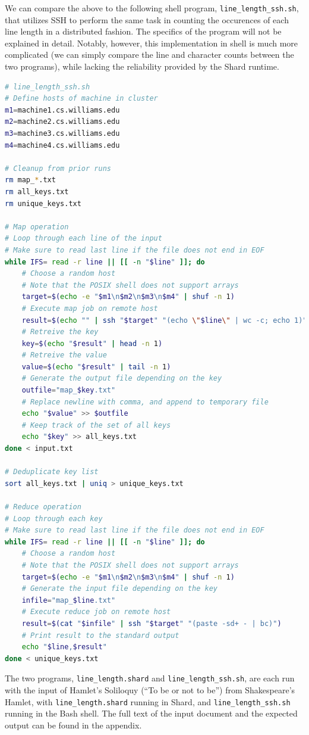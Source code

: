 \documentclass[twoside]{report}
\begin{document}
We can compare the above to the following shell program, \texttt{line\_length\_ssh.sh}, that utilizes SSH to perform the same task in counting the occurences of each line length in a distributed fashion.
The specifics of the program will not be explained in detail.
Notably, however, this implementation in shell is much more complicated (we can simply compare the line and character counts between the two programs), while lacking the reliability provided by the Shard runtime.
\begin{lstlisting}[language=sh]
# line_length_ssh.sh
# Define hosts of machine in cluster
m1=machine1.cs.williams.edu
m2=machine2.cs.williams.edu
m3=machine3.cs.williams.edu
m4=machine4.cs.williams.edu

# Cleanup from prior runs
rm map_*.txt
rm all_keys.txt
rm unique_keys.txt

# Map operation
# Loop through each line of the input
# Make sure to read last line if the file does not end in EOF
while IFS= read -r line || [[ -n "$line" ]]; do
    # Choose a random host
    # Note that the POSIX shell does not support arrays
    target=$(echo -e "$m1\n$m2\n$m3\n$m4" | shuf -n 1)
    # Execute map job on remote host
    result=$(echo "" | ssh "$target" "(echo \"$line\" | wc -c; echo 1)")
    # Retreive the key
    key=$(echo "$result" | head -n 1)
    # Retreive the value
    value=$(echo "$result" | tail -n 1)
    # Generate the output file depending on the key
    outfile="map_$key.txt"
    # Replace newline with comma, and append to temporary file
    echo "$value" >> $outfile
    # Keep track of the set of all keys
    echo "$key" >> all_keys.txt
done < input.txt

# Deduplicate key list
sort all_keys.txt | uniq > unique_keys.txt

# Reduce operation
# Loop through each key
# Make sure to read last line if the file does not end in EOF
while IFS= read -r line || [[ -n "$line" ]]; do
    # Choose a random host
    # Note that the POSIX shell does not support arrays
    target=$(echo -e "$m1\n$m2\n$m3\n$m4" | shuf -n 1)
    # Generate the input file depending on the key
    infile="map_$line.txt"
    # Execute reduce job on remote host
    result=$(cat "$infile" | ssh "$target" "(paste -sd+ - | bc)")
    # Print result to the standard output
    echo "$line,$result"
done < unique_keys.txt
\end{lstlisting}

The two programs, \texttt{line\_length.shard} and \texttt{line\_length\_ssh.sh}, are each run with the input of Hamlet's Soliloquy (``To be or not to be'') from Shakespeare's Hamlet, with \texttt{line\_length.shard} running in Shard, and \texttt{line\_length\_ssh.sh} running in the Bash shell.
The full text of the input document and the expected output can be found in the appendix.
\end{document}
